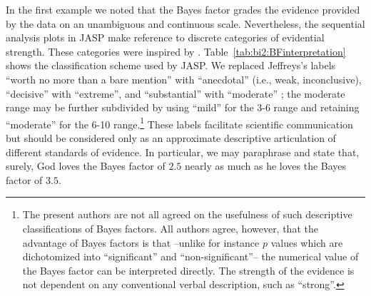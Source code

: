 In the first example we noted that the Bayes factor grades the evidence provided by the data on an unambiguous and continuous scale. Nevertheless, the sequential analysis plots in JASP make reference to discrete categories of evidential strength. These categories were inspired by . Table~\ref{tab:bi2:BFinterpretation} shows the classification scheme used by JASP. We replaced Jeffreys's labels ``worth no more than a bare mention'' with ``anecdotal'' (i.e., weak, inconclusive), ``decisive'' with ``extreme'', and ``substantial'' with ``moderate'' \cite{LeeWagenmakersBayesBook}; the moderate range may be further subdivided by using ``mild'' for the 3-6 range and retaining ``moderate'' for the 6-10 range.\footnote{The present authors are not all agreed on the usefulness of such descriptive classifications of Bayes factors. All authors agree, however, that the advantage of Bayes factors is that --unlike for instance $p$ values which are dichotomized into ``significant'' and ``non-significant''-- the numerical value of the Bayes factor can be interpreted directly. The strength of the evidence is not dependent on any conventional verbal description, such as ``strong''.} These labels facilitate scientific communication but should be considered only as an approximate descriptive articulation of different standards of evidence. In particular, we may paraphrase  and state that, surely, God loves the Bayes factor of $2.5$ nearly as much as he loves the Bayes factor of $3.5$.

